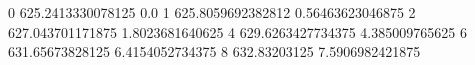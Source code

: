 0 625.2413330078125 0.0
1 625.8059692382812 0.56463623046875
2 627.043701171875 1.8023681640625
4 629.6263427734375 4.385009765625
6 631.65673828125 6.4154052734375
8 632.83203125 7.5906982421875
